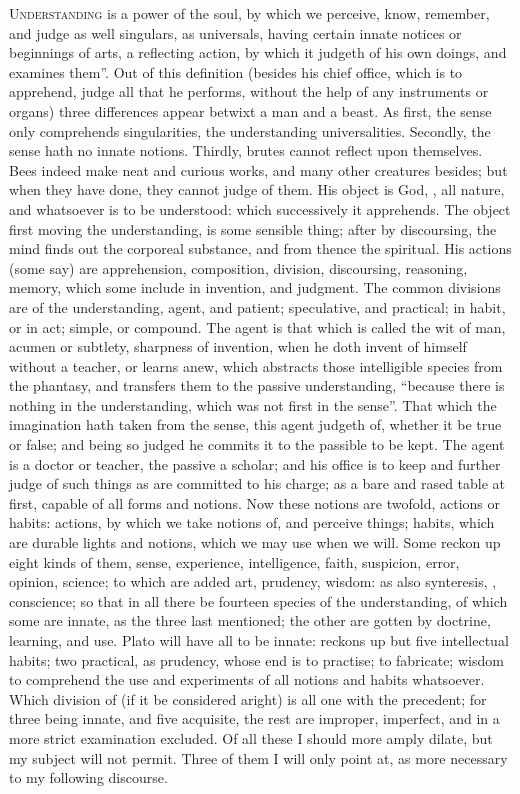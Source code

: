 \lettrine[ante={\large{}``}]{U}{nderstanding} is a power of the soul,
by which we perceive, know, remember, and judge as well
singulars, as universals, having certain innate notices or beginnings of arts,
a reflecting action, by which it judgeth of his own doings, and examines them''.
Out of this definition (besides his chief office, which is to apprehend, judge
all that he performs, without the help of any instruments or organs) three
differences appear betwixt a man and a beast. As first, the sense only
comprehends singularities, the understanding universalities. Secondly, the
sense hath no innate notions. Thirdly, brutes cannot reflect upon themselves.
Bees indeed make neat and curious works, and many other creatures besides; but
when they have done, they cannot judge of them. His object is God,
, all nature, and whatsoever is to be understood: which
successively it apprehends. The object first moving the understanding, is some
sensible thing; after by discoursing, the mind finds out the corporeal
substance, and from thence the spiritual. His actions (some say) are
apprehension, composition, division, discoursing, reasoning, memory, which some
include in invention, and judgment. The common divisions are of the
understanding, agent, and patient; speculative, and practical; in habit, or in
act; simple, or compound. The agent is that which is called the wit of man,
acumen or subtlety, sharpness of invention, when he doth invent of himself
without a teacher, or learns anew, which abstracts those intelligible species
from the phantasy, and transfers them to the passive understanding,
\enquote{because there is nothing in the understanding, which was
not first in the sense}. That which the imagination hath taken from the sense,
this agent judgeth of, whether it be true or false; and being so judged he
commits it to the passible to be kept. The agent is a doctor or teacher, the
passive a scholar; and his office is to keep and further judge of such things
as are committed to his charge; as a bare and rased table at first, capable of
all forms and notions. Now these notions are twofold, actions or habits:
actions, by which we take notions of, and perceive things; habits, which are
durable lights and notions, which we may use when we will. Some reckon up eight
kinds of them, sense, experience, intelligence, faith, suspicion, error,
opinion, science; to which are added art, prudency, wisdom: as also
synteresis, , conscience; so that in
all there be fourteen species of the understanding, of which some are innate,
as the three last mentioned; the other are gotten by doctrine, learning, and
use. Plato will have all to be innate: \Aristotle{} reckons up but five
intellectual habits; two practical, as prudency, whose end is to practise; to
fabricate; wisdom to comprehend the use and experiments of all notions and
habits whatsoever. Which division of \Aristotle{} (if it be considered aright) is
all one with the precedent; for three being innate, and five acquisite, the
rest are improper, imperfect, and in a more strict examination excluded. Of all
these I should more amply dilate, but my subject will not permit. Three of them
I will only point at, as more necessary to my following discourse.

